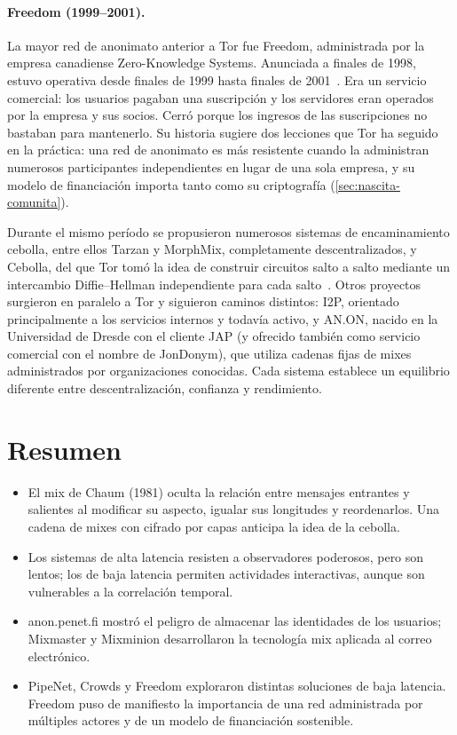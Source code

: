 \paragraph{Freedom (1999--2001).} La mayor red de anonimato anterior a Tor fue Freedom, administrada por la empresa canadiense Zero-Knowledge Systems. Anunciada a finales de 1998, estuvo operativa desde finales de 1999 hasta finales de 2001~\cite{syverson2011peel}. Era un servicio comercial: los usuarios pagaban una suscripción y los servidores eran operados por la empresa y sus socios. Cerró porque los ingresos de las suscripciones no bastaban para mantenerlo. Su historia sugiere dos lecciones que Tor ha seguido en la práctica: una red de anonimato es más resistente cuando la administran numerosos participantes independientes en lugar de una sola empresa, y su modelo de financiación importa tanto como su criptografía (\cref{sec:nascita-comunita}).

\begin{approfondimento}
Durante el mismo período se propusieron numerosos sistemas de encaminamiento cebolla, entre ellos Tarzan y MorphMix, completamente descentralizados, y Cebolla, del que Tor tomó la idea de construir circuitos salto a salto mediante un intercambio Diffie--Hellman independiente para cada salto~\cite{syverson2011peel}. Otros proyectos surgieron en paralelo a Tor y siguieron caminos distintos: I2P, orientado principalmente a los servicios internos y todavía activo, y AN.ON, nacido en la Universidad de Dresde con el cliente JAP (y ofrecido también como servicio comercial con el nombre de JonDonym), que utiliza cadenas fijas de mixes administrados por organizaciones conocidas. Cada sistema establece un equilibrio diferente entre descentralización, confianza y rendimiento.
\end{approfondimento}

\section*{Resumen}
\begin{itemize}
  \item El mix de Chaum (1981) oculta la relación entre mensajes entrantes y salientes al modificar su aspecto, igualar sus longitudes y reordenarlos. Una cadena de mixes con cifrado por capas anticipa la idea de la cebolla.
  \item Los sistemas de alta latencia resisten a observadores poderosos, pero son lentos; los de baja latencia permiten actividades interactivas, aunque son vulnerables a la correlación temporal.
  \item anon.penet.fi mostró el peligro de almacenar las identidades de los usuarios; Mixmaster y Mixminion desarrollaron la tecnología mix aplicada al correo electrónico.
  \item PipeNet, Crowds y Freedom exploraron distintas soluciones de baja latencia. Freedom puso de manifiesto la importancia de una red administrada por múltiples actores y de un modelo de financiación sostenible.
\end{itemize}

